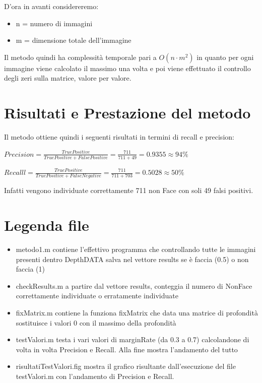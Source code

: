 \documentclass[
  italian,
]{article}
\providecommand{\tightlist}{%
  \setlength{\itemsep}{0pt}\setlength{\parskip}{0pt}}
\begin{document}
D'ora in avanti considereremo:

\begin{itemize}
\tightlist
\item
  n = numero di immagini
\item
  m = dimensione totale dell'immagine
\end{itemize}

Il metodo quindi ha complessità temporale pari a \(O(n \cdot m^2)\) in
quanto per ogni immagine viene calcolato il massimo una volta e poi
viene effettuato il controllo degli zeri sulla matrice, valore per
valore.

\hypertarget{risultati-e-prestazione-del-metodo}{%
\section{Risultati e Prestazione del
metodo}\label{risultati-e-prestazione-del-metodo}}

Il metodo ottiene quindi i seguenti risultati in termini di recall e
precision:

\(Precision = \frac{TruePositive}{TruePositive + FalsePositive} = \frac{711}{711+49} = 0.9355 \approx 94\%\)

\(Recalll = \frac{TruePositive}{TruePositive + FalseNegative} = \frac{711}{711+703} = 0.5028 \approx 50\%\)

Infatti vengono individuate correttamente 711 non Face con soli 49 falsi
positivi.

\pagebreak

\hypertarget{legenda-file}{%
\section{Legenda file}\label{legenda-file}}

\begin{itemize}
\tightlist
\item
  metodo1.m contiene l'effettivo programma che controllando tutte le
  immagini presenti dentro DepthDATA salva nel vettore results se è
  faccia (0.5) o non faccia (1)
\item
  checkResults.m a partire dal vettore results, conteggia il numero di
  NonFace correttamente individuate o erratamente individuate
\item
  fixMatrix.m contiene la funziona fixMatrix che data una matrice di
  profondità sostituisce i valori 0 con il massimo della profondità
\item
  testValori.m testa i vari valori di marginRate (da 0.3 a 0.7)
  calcolandone di volta in volta Precision e Recall. Alla fine mostra
  l'andamento del tutto
\item
  risultatiTestValori.fig mostra il grafico risultante dall'esecuzione
  del file testValori.m con l'andamento di Precision e Recall.
\end{itemize}
\end{document}
